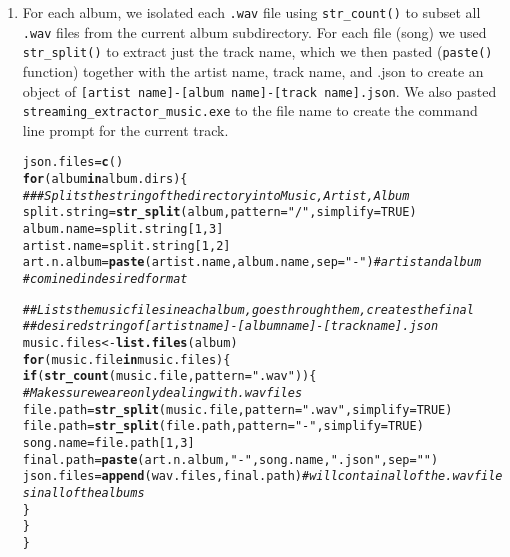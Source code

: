 \documentclass{article}\usepackage[]{graphicx}\usepackage[]{xcolor}
\makeatletter
\newcommand{\hlnum}[1]{\textcolor[rgb]{0.686,0.059,0.569}{#1}}%
\newcommand{\hlsng}[1]{\textcolor[rgb]{0.192,0.494,0.8}{#1}}%
\newcommand{\hlcom}[1]{\textcolor[rgb]{0.678,0.584,0.686}{\textit{#1}}}%
\newcommand{\hldef}[1]{\textcolor[rgb]{0.345,0.345,0.345}{#1}}%
\newcommand{\hlkwa}[1]{\textcolor[rgb]{0.161,0.373,0.58}{\textbf{#1}}}%
\newcommand{\hlkwb}[1]{\textcolor[rgb]{0.69,0.353,0.396}{#1}}%
\newcommand{\hlkwc}[1]{\textcolor[rgb]{0.333,0.667,0.333}{#1}}%
\newcommand{\hlkwd}[1]{\textcolor[rgb]{0.737,0.353,0.396}{\textbf{#1}}}%
\newenvironment{kframe}{%
 \def\at@end@of@kframe{}%
 \ifinner\ifhmode%
  \def\at@end@of@kframe{\end{minipage}}%
  \begin{minipage}{\columnwidth}%
 \fi\fi%
 \def\FrameCommand##1{\hskip\@totalleftmargin \hskip-\fboxsep
 \colorbox{shadecolor}{##1}\hskip-\fboxsep
     \hskip-\linewidth \hskip-\@totalleftmargin \hskip\columnwidth}%
 \MakeFramed {\advance\hsize-\width
   \@totalleftmargin\z@ \linewidth\hsize
   \@setminipage}}%
 {\par\unskip\endMakeFramed%
 \at@end@of@kframe}
\newenvironment{knitrout}{}{} %
\makeatother
\begin{document}
\begin{multicols}{2}
\begin{enumerate}[1.]
\item For each album, we isolated each \texttt{.wav} file using \texttt{str\_count()} to subset all \texttt{.wav} files from the current album subdirectory. For each file (song) we used \texttt{str\_split()} to extract just the track name, which we then pasted (\texttt{paste()} function) together with the artist name, track name, and .json to create an object of \texttt{[artist name]-[album name]-[track name].json}. We also pasted \texttt{streaming\_extractor\_music.exe} to the file name to create the command line prompt for the current track.
\begin{knitrout}\scriptsize
{}\color{fgcolor}\begin{kframe}
\begin{alltt}
\hldef{json.files} \hlkwb{=} \hlkwd{c}\hldef{()}
\hlkwa{for} \hldef{(album} \hlkwa{in} \hldef{album.dirs)\{}
  \hlcom{###Splits the string of the directory into Music, Artist, Album}
  \hldef{split.string} \hlkwb{=} \hlkwd{str_split}\hldef{(album,} \hlkwc{pattern} \hldef{=} \hlsng{"/"}\hldef{,} \hlkwc{simplify} \hldef{=} \hlnum{TRUE}\hldef{)}
  \hldef{album.name} \hlkwb{=} \hldef{split.string[}\hlnum{1}\hldef{,} \hlnum{3}\hldef{]}
  \hldef{artist.name} \hlkwb{=} \hldef{split.string[}\hlnum{1}\hldef{,} \hlnum{2}\hldef{]}
  \hldef{art.n.album} \hlkwb{=} \hlkwd{paste}\hldef{(artist.name, album.name,} \hlkwc{sep} \hldef{=} \hlsng{"-"}\hldef{)} \hlcom{#artist and album}
                                                          \hlcom{#comined in desired format}

  \hlcom{##Lists the music files in each album, goes through them, creates the final}
  \hlcom{##desired string of [artist name]-[album name]-[trackname].json}
  \hldef{music.files} \hlkwb{<-} \hlkwd{list.files}\hldef{(album)}
  \hlkwa{for} \hldef{(music.file} \hlkwa{in} \hldef{music.files)\{}
    \hlkwa{if} \hldef{(}\hlkwd{str_count}\hldef{(music.file,} \hlkwc{pattern} \hldef{=} \hlsng{".wav"}\hldef{))\{}
      \hlcom{#Makes sure we are only dealing with .wav files}
      \hldef{file.path} \hlkwb{=} \hlkwd{str_split}\hldef{(music.file,} \hlkwc{pattern} \hldef{=} \hlsng{".wav"}\hldef{,} \hlkwc{simplify} \hldef{=}  \hlnum{TRUE}\hldef{)}
      \hldef{file.path} \hlkwb{=} \hlkwd{str_split}\hldef{(file.path,} \hlkwc{pattern} \hldef{=} \hlsng{"-"}\hldef{,} \hlkwc{simplify} \hldef{=} \hlnum{TRUE}\hldef{)}
      \hldef{song.name} \hlkwb{=} \hldef{file.path[}\hlnum{1}\hldef{,} \hlnum{3}\hldef{]}
      \hldef{final.path} \hlkwb{=} \hlkwd{paste}\hldef{(art.n.album,} \hlsng{"-"}\hldef{, song.name,} \hlsng{".json"}\hldef{,} \hlkwc{sep} \hldef{=} \hlsng{""}\hldef{)}
      \hldef{json.files} \hlkwb{=} \hlkwd{append}\hldef{(wav.files, final.path)} \hlcom{#will contain all of the .wav files in all of the albums }
    \hldef{\}}
  \hldef{\}}
\hldef{\}}


\end{alltt}
\end{kframe}
\end{knitrout}
\end{enumerate}
\end{multicols}
\end{document}
